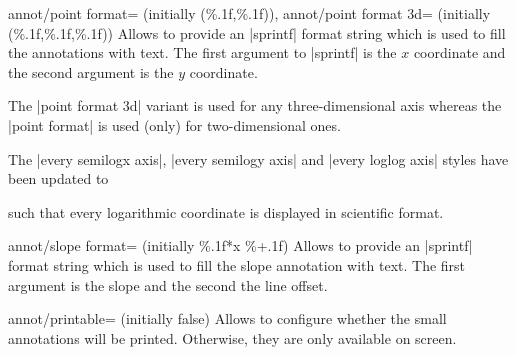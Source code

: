 \begin{pgfplotskeylist}{%
    annot/point format= (initially {(\%.1f,\%.1f)}),
    annot/point format 3d= (initially {(\%.1f,\%.1f,\%.1f)})%
}
    Allows to provide an |sprintf| format string which is used to fill the
    annotations with text. The first argument to |sprintf| is the
    $x$ coordinate and the second argument is the $y$ coordinate.

    The |point format 3d| variant is used for any three-dimensional axis
    whereas the |point format| is used (only) for two-dimensional ones.

    The |every semilogx axis|, |every semilogy axis| and |every loglog axis|
    styles have been updated to
\begin{codeexample}
\end{codeexample}
    \noindent such
    that every logarithmic coordinate is displayed in scientific
    format.
\end{pgfplotskeylist}

\begin{pgfplotskey}{annot/slope format= (initially \%.1f*x \%+.1f)}
    Allows to provide an |sprintf| format string which is used to fill the
    slope annotation with text. The first argument is the slope and the second
    the line offset.
\end{pgfplotskey}

\begin{pgfplotskey}{annot/printable= (initially false)}
    Allows to configure whether the small annotations will be printed.
    Otherwise, they are only available on screen.
\end{pgfplotskey}

